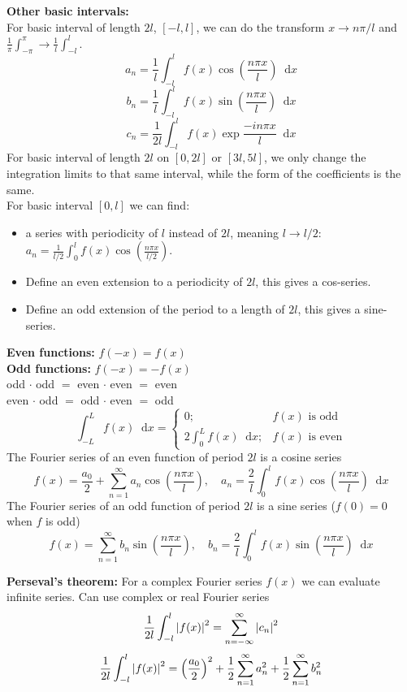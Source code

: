 \documentclass[a4paper, 10pt]{article}
\newcommand*\diff{\mathop{}\!\mathrm{d}}
\begin{document}
\begin{multicols*}{3}
\textbf{Other basic intervals:}\\
For basic interval of length $2l$, $[-l, l]$, we can do the transform $x\rightarrow n\pi/l$ and $\frac{1}{\pi}\int_{-\pi}^\pi \rightarrow \frac{1}{l}\int_{-l}^l$.
$$ a_n = \frac{1}{l}\int_{-l}^l f(x) \cos{\left(\frac{n\pi x}{l}\right)} \diff x$$
$$ b_n = \frac{1}{l}\int_{-l}^l f(x) \sin{\left(\frac{n\pi x}{l}\right)} \diff x$$
$$ c_n = \frac{1}{2l}\int_{-l}^l f(x) \exp{\frac{-in\pi x}{l}} \diff x$$
For basic interval of length $2l$ on $[0, 2l]$ or $[3l, 5l]$, we only change the integration limits to that same interval, while the form of the coefficients is the same.\\
For basic interval $[0, l]$ we can find:
\begin{itemize}
  \item a series with periodicity of $l$ instead of $2l$, meaning $l\rightarrow l/2$: $a_n = \frac{1}{l/2}\int_0^l f(x)\cos{\left( \frac{n\pi x}{l/2} \right)}$.
  \item Define an even extension to a periodicity of $2l$, this gives a cos-series.
  \item Define an odd extension of the period to a length of $2l$, this gives a sine-series.
\end{itemize}
\textbf{Even functions:} $f(-x)=f(x)$\\
\textbf{Odd  functions:} $f(-x)=-f(x)$\\
odd $\cdot$ odd $=$ even $\cdot$ even $=$ even\\
even $\cdot$ odd $=$ odd $\cdot$ even $=$ odd
\begin{equation*} \int_{-L}^{L}f(x) \diff x = \begin{cases}
0; & f(x) \text{ is odd} \\
2\int_0^L f(x) \diff x; & f(x) \text{ is even}
\end{cases} \end{equation*}
The Fourier series of an even function of period $2l$ is a cosine series
$$f(x)= \frac{a_0}{2} + \sum_{n=1}^{\infty} a_n \cos{\left( \frac{n\pi x}{l} \right)},\quad a_n = \frac{2}{l}\int_0^lf(x)\cos{\left( \frac{n\pi x}{l} \right)}\diff x $$
The Fourier series of an odd function of period $2l$ is a sine series ($f(0)=0$ when $f$ is odd)
$$f(x)= \sum_{n=1}^{\infty} b_n \sin{\left( \frac{n\pi x}{l} \right)},\quad b_n = \frac{2}{l}\int_0^lf(x)\sin{\left( \frac{n\pi x}{l} \right)}\diff x $$

\textbf{Perseval's theorem:}
For a complex Fourier series $f(x)$ we can evaluate infinite series. Can use complex or real Fourier series
$$ \frac{1}{2l}\int_{-l}^{l} \abs{f(x)}^2 = \sum_{n=-\infty}^{\infty} \abs{c_n}^2$$
$$ \frac{1}{2l}\int_{-l}^{l} \abs{f(x)}^2 = \left(\frac{a_0}{2}\right)^2 + \frac{1}{2}\sum_{n=1}^{\infty} a_n^2 + \frac{1}{2}\sum_{n=1}^{\infty} b_n^2$$
\begin{mdframed}

\end{mdframed}
\end{multicols*}
\end{document}
